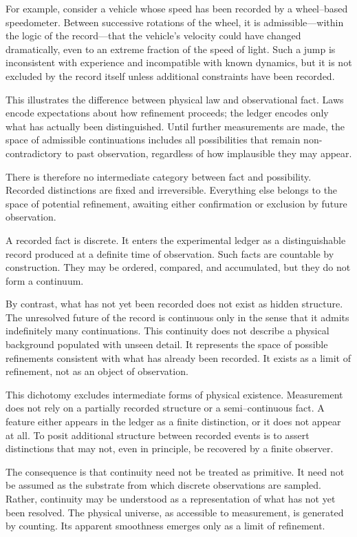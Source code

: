 For example, consider a vehicle whose speed has been recorded by a wheel--based
speedometer. Between successive rotations of the wheel, it is admissible---within
the logic of the record---that the vehicle’s velocity could have changed
dramatically, even to an extreme fraction of the speed of light. Such a jump is
inconsistent with experience and incompatible with known dynamics, but it is
not excluded by the record itself unless additional constraints have been
recorded.

This illustrates the difference between physical law and observational fact.
Laws encode expectations about how refinement proceeds; the ledger encodes only
what has actually been distinguished. Until further measurements are made, the
space of admissible continuations includes all possibilities that remain
non-contradictory to past observation, regardless of how implausible they may
appear.

There is therefore no intermediate category between fact and possibility.
Recorded distinctions are fixed and irreversible. Everything else belongs to
the space of potential refinement, awaiting either confirmation or exclusion by
future observation.

A recorded fact is discrete. It enters the experimental ledger as a distinguishable record
produced at a definite time of observation. Such facts are countable by
construction. They may be ordered, compared, and accumulated, but they do not
form a continuum. 

By contrast, what has not yet been recorded does not exist as hidden structure.
The unresolved future of the record is continuous only in the sense that it
admits indefinitely many continuations. This continuity does not
describe a physical background populated with unseen detail. It represents the
space of possible refinements consistent with what has already been recorded.
It exists as a limit of refinement, not as an object of observation.

This dichotomy excludes intermediate forms of physical existence. Measurement does
not rely on a partially recorded structure or a semi--continuous fact.
A feature either appears in the ledger as a finite distinction, or it does not
appear at all. To posit additional structure between recorded events is to
assert distinctions that may not, even in principle, be recovered by a
finite observer.

The consequence is that continuity need not be treated as primitive. It need
not be assumed as the substrate from which discrete observations are sampled.
Rather, continuity may be understood as a representation of what has not yet
been resolved. The physical universe, as accessible to measurement, is generated
by counting. Its apparent smoothness emerges only as a limit of 
refinement.

